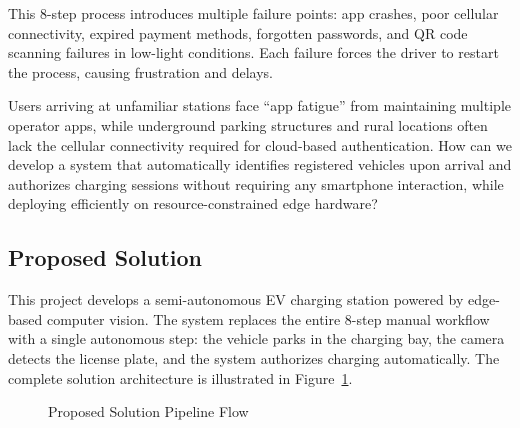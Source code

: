 \documentclass[11pt]{report}
\begin{document}
This 8-step process introduces multiple failure points: app crashes, poor cellular connectivity, expired payment methods, forgotten passwords, and QR code scanning failures in low-light conditions. Each failure forces the driver to restart the process, causing frustration and delays.

Users arriving at unfamiliar stations face ``app fatigue'' from maintaining multiple operator apps, while underground parking structures and rural locations often lack the cellular connectivity required for cloud-based authentication. How can we develop a system that automatically identifies registered vehicles upon arrival and authorizes charging sessions without requiring any smartphone interaction, while deploying efficiently on resource-constrained edge hardware?

\subsection{Proposed Solution}
This project develops a semi-autonomous EV charging station powered by edge-based computer vision. The system replaces the entire 8-step manual workflow with a single autonomous step: the vehicle parks in the charging bay, the camera detects the license plate, and the system authorizes charging automatically. The complete solution architecture is illustrated in Figure~\ref{fig:solution_flow}.

\begin{figure}[H]
\centering
{}
\caption{Proposed Solution Pipeline Flow}
\label{fig:solution_flow}
\end{figure}
\end{document}

